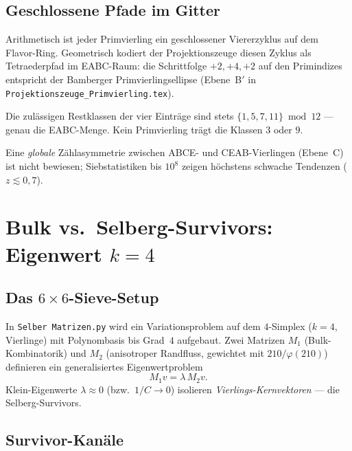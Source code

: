 \documentclass[12pt,a4paper]{article}
\begin{document}
\subsection{Geschlossene Pfade im Gitter}

Arithmetisch ist jeder Primvierling ein geschlossener Viererzyklus
auf dem Flavor-Ring. Geometrisch kodiert der Projektionszeuge
diesen Zyklus als Tetraederpfad im EABC-Raum: die Schrittfolge
$+2,+4,+2$ auf den Primindizes entspricht der Bamberger
Primvierlingsellipse (Ebene~B$'$ in \texttt{Projektionszeuge\_Primvierling.tex}).

\begin{tcolorbox}[bewiesen]
Die zulässigen Restklassen der vier Einträge sind stets
$\{1,5,7,11\}\bmod 12$ --- genau die EABC-Menge.
Kein Primvierling trägt die Klassen $3$ oder $9$.
\end{tcolorbox}

\begin{tcolorbox}[offen]
Eine \emph{globale} Zählasymmetrie zwischen ABCE- und CEAB-Vierlingen
(Ebene~C) ist nicht bewiesen; Siebstatistiken bis $10^8$ zeigen
höchstens schwache Tendenzen ($z\lesssim 0{,}7$).
\end{tcolorbox}

\section{Bulk vs.\ Selberg-Survivors: Eigenwert $k=4$}
\label{sec:selberg}

\subsection{Das $6\times 6$-Sieve-Setup}

In \texttt{Selber Matrizen.py} wird ein Variationsproblem auf dem
$4$-Simplex ($k=4$, Vierlinge) mit Polynombasis bis Grad~$4$ aufgebaut.
Zwei Matrizen $M_1$ (Bulk-Kombinatorik) und $M_2$ (anisotroper Randfluss,
gewichtet mit $210/\varphi(210)$) definieren ein generalisiertes
Eigenwertproblem
\[
M_1 v = \lambda\, M_2 v.
\]
Klein-Eigenwerte $\lambda\approx 0$ (bzw.\ $1/C\to 0$) isolieren
\emph{Vierlings-Kernvektoren} --- die Selberg-Survivors.

\subsection{Survivor-Kanäle}
\end{document}
